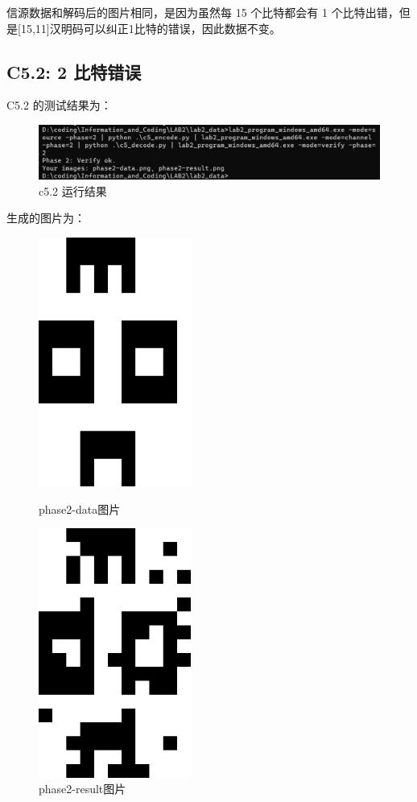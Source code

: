 \documentclass[12pt, a4paper]{ctexart}
\begin{document}
    信源数据和解码后的图片相同，是因为虽然每 15 个比特都会有 1 个比特出错，但是[15,11]汉明码可以纠正1比特的错误，因此数据不变。


    \subsection*{C5.2: 2 比特错误}
    C5.2 的测试结果为：
    \begin{figure}[H]
        \centering
        \includegraphics[width=12cm]{./pic/3-2.png}		
        \caption{c5.2 运行结果}
    \end{figure}

    生成的图片为：
    \begin{figure}[H]
    \centering
    \begin{minipage}[t]{0.45\textwidth}
    \centering
    \includegraphics[width=5cm]{./pic/phase2-data.png}
    \caption{phase2-data图片}
    \end{minipage}
    \hfill
    \begin{minipage}[t]{0.45\textwidth}
    \centering
    \includegraphics[width=5cm]{./pic/phase2-result.png}
    \caption{phase2-result图片}
    \end{minipage}
    \end{figure}
\end{document}
